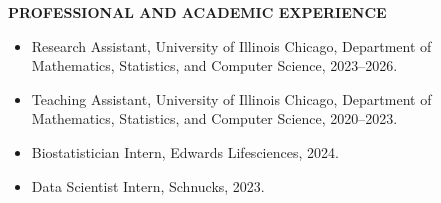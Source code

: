 \documentclass[12pt,reqno,oneside]{amsbook}
\theoremstyle{definition}
\theoremstyle{remark}
\begin{document}
\vspace{0.3cm}

\noindent
\textbf{PROFESSIONAL AND ACADEMIC EXPERIENCE}

\begin{itemize}
    \item Research Assistant, University of Illinois Chicago, Department of Mathematics, Statistics, and Computer Science,
    2023--2026.
    \item Teaching Assistant, University of Illinois Chicago,
    Department of Mathematics, Statistics, and Computer Science,
    2020--2023.
    \item Biostatistician Intern, Edwards Lifesciences, 2024.

    \item Data Scientist Intern, Schnucks, 2023.

\end{itemize}
\end{document}
